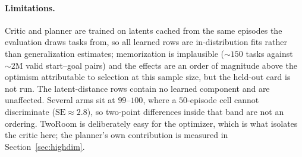 \paragraph{Limitations.}
Critic and planner are trained on latents cached from the same episodes the
evaluation draws tasks from, so all learned rows are in-distribution fits rather
than generalization estimates; memorization is implausible (${\sim}150$ tasks
against ${\sim}2$M valid start--goal pairs) and the effects are an order of
magnitude above the optimism attributable to selection at this sample size, but
the held-out card is not run. The latent-distance rows contain no learned
component and are unaffected. Several arms sit at $99$--$100$, where a
$50$-episode cell cannot discriminate ($\mathrm{SE} \approx 2.8$), so two-point
differences inside that band are not an ordering. TwoRoom is deliberately easy
for the optimizer, which is what isolates the critic here; the planner's own
contribution is measured in Section~\ref{sec:highdim}.
